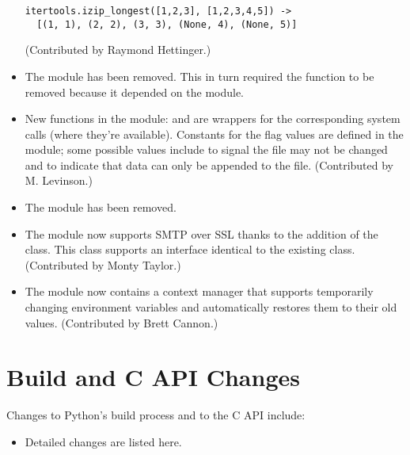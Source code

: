 \documentclass{howto}
\begin{document}
\begin{itemize}
\begin{verbatim}
itertools.izip_longest([1,2,3], [1,2,3,4,5]) ->
  [(1, 1), (2, 2), (3, 3), (None, 4), (None, 5)]
\end{verbatim}

(Contributed by Raymond Hettinger.)

\item The  module has been removed.  This in turn
required the  function to be removed
because it depended on the  module.

\item New functions in the  module: 
and  are wrappers for the corresponding system
calls (where they're available).  Constants for the flag values are
defined in the  module; some possible values include
 to signal the file may not be changed and
 to indicate that data can only be appended to the
file.  (Contributed by M. Levinson.)

\item The  module has been removed.

\item The  module now supports SMTP over 
SSL thanks to the addition of the  class.
This class supports an interface identical to the existing  
class. (Contributed by Monty Taylor.)

\item The  module now contains a
 context manager that 
supports temporarily changing environment variables and 
automatically restores them to their old values.
(Contributed by Brett Cannon.)

\end{itemize}




\section{Build and C API Changes}

Changes to Python's build process and to the C API include:

\begin{itemize}

\item Detailed changes are listed here.

\end{itemize}
\end{document}
